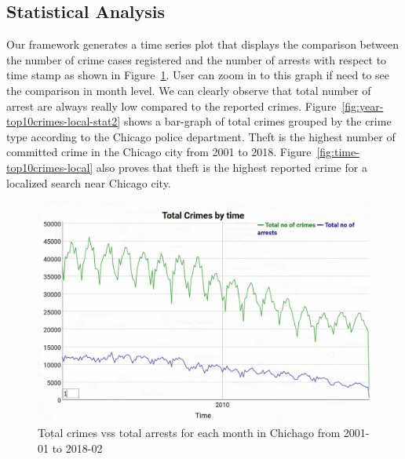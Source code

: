 \subsection{Statistical Analysis}

Our framework generates a time series plot that displays the
comparison between the number of crime cases registered and the number
of arrests with respect to time stamp as shown in
Figure~\ref{fig:time-top10crimes-local-stat1}. User can zoom in to
this graph if need to see the comparison in month level. We can
clearly observe that total number of arrest are always really low
compared to the reported
crimes. Figure~\ref{fig:year-top10crimes-local-stat2} shows a
bar-graph of total crimes grouped by the crime type according to the
Chicago police department. Theft is the highest number of committed
crime in the Chicago city from 2001 to 2018.
Figure~\ref{fig:time-top10crimes-local} also proves that theft is the
highest reported crime for a localized search near Chicago city.

\begin{figure}[htb]
	\centering\includegraphics[width=\columnwidth]{images/stat1.jpg}
	\caption{Total crimes vss total arrests for each month in Chichago
        from 2001-01 to 2018-02}\label{fig:time-top10crimes-local-stat1}
\end{figure}

